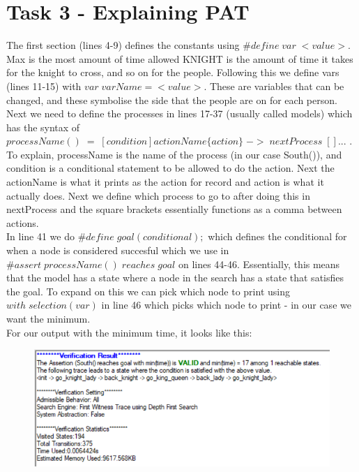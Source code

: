 \documentclass{article}
\newcommand\tab[1][1cm]{\hspace*{#1}}
\begin{document}
\section*{Task 3 - Explaining PAT}
The first section (lines 4-9) defines the constants using 
$\#define\; var\; <value>$. Max is the most amount of time allowed
KNIGHT is the amount of time it takes for the knight to cross, and so on for
the people. Following this we define vars (lines 11-15) with 
$var\; varName = <value>$. These are variables
that can be changed, and these symbolise the side that the
people are on for each person. \\
\tab Next we need to define the processes in lines 17-37 
(usually called models) which has the syntax of 
$processName()\; =\; [condition]actionName\{action\}\; ->\; nextProcess\; [] ...$
. To explain, processName is the name of the process (in our case
South()), and condition is a conditional statement to be allowed
to do the action. Next the actionName is what it prints as 
the action for record and action is what it actually does. Next
we define which process to go to after doing this in nextProcess
and the square brackets essentially functions as a comma between
actions. \\
\tab In line 41 we do $\#define\; goal(conditional);$ which 
defines the conditional
for when a node is considered succesful which we use in 
$\#assert\; processName()\; reaches\; goal$ on lines 44-46. Essentially, 
this means that the model has a state where a node in the 
search has a state that satisfies the goal. To expand
on this we can pick which node to print using 
$with\; selection(var)$ in line 46 which picks which node to 
print - in our case we want the minimum.\\
For our output with the minimum time, it looks like this:
\begin{figure}[ht]
    \centering
    \includegraphics{imgs/verification.png}
\end{figure}
\end{document}
